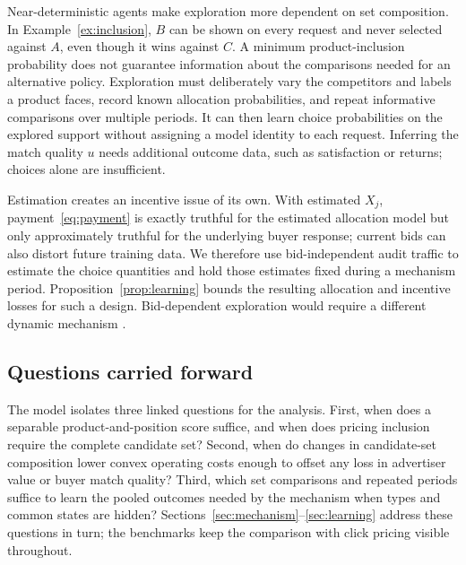 \documentclass[opre,dblanonrev]{informs4}
\providecommand{\1}{\mathbf{1}}
\begin{document}
Near-deterministic agents make exploration more dependent on set composition. In Example~\ref{ex:inclusion}, $B$ can be shown on every request and never selected against $A$, even though it wins against $C$. A minimum product-inclusion probability does not guarantee information about the comparisons needed for an alternative policy. Exploration must deliberately vary the competitors and labels a product faces, record known allocation probabilities, and repeat informative comparisons over multiple periods. It can then learn choice probabilities on the explored support without assigning a model identity to each request. Inferring the match quality $u$ needs additional outcome data, such as satisfaction or returns; choices alone are insufficient.

Estimation creates an incentive issue of its own. With estimated $X_j$, payment~\eqref{eq:payment} is exactly truthful for the estimated allocation model but only approximately truthful for the underlying buyer response; current bids can also distort future training data. We therefore use bid-independent audit traffic to estimate the choice quantities and hold those estimates fixed during a mechanism period. Proposition~\ref{prop:learning} bounds the resulting allocation and incentive losses for such a design. Bid-dependent exploration would require a different dynamic mechanism \citep{babaioff2014characterizing}.

\subsection{Questions carried forward}\label{sec:model-questions}

The model isolates three linked questions for the analysis. First, when does a separable product-and-position score suffice, and when does pricing inclusion require the complete candidate set? Second, when do changes in candidate-set composition lower convex operating costs enough to offset any loss in advertiser value or buyer match quality? Third, which set comparisons and repeated periods suffice to learn the pooled outcomes needed by the mechanism when types and common states are hidden? Sections~\ref{sec:mechanism}--\ref{sec:learning} address these questions in turn; the benchmarks keep the comparison with click pricing visible throughout.



\end{document}
